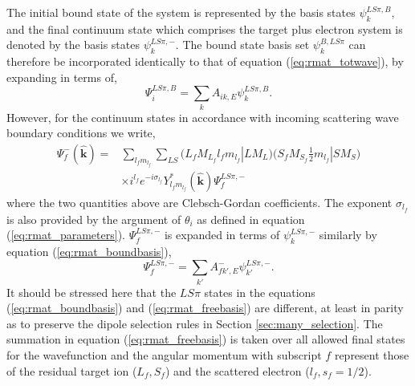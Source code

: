 The initial bound state of the system is represented by the basis states $\psi_k^{LS\pi,B}$, and the final continuum state which comprises the target plus electron system is denoted by the basis states $\psi_k^{LS\pi,-}$. The bound state basis set $\psi_k^{B, LS\pi}$ can therefore be incorporated identically to that of equation (\ref{eq:rmat_totwave}), by expanding in terms of,
\begin{equation}\label{eq:rmat_boundbasis}
\Psi_i^{LS\pi,B} =\sum_kA_{ik,E} \psi_k^{LS\pi,B}.
\end{equation}
However, for the continuum states in accordance with incoming scattering wave boundary conditions we write,
\begin{equation}\label{eq:rmat_freebasis}
\begin{split}
\Psi_f^{-}(\boldsymbol{\hat{k}}) = & \sum_{l_fm_{l_f}}\sum_{LS}(L_fM_{L_f}l_fm_{l_f} |LM_L) \Big(S_fM_{S_f}\frac{1}{2}m_{l_f} | SM_S\Big)\\
& \times i^{l_f}e^{-i\sigma_{l_f}}Y_{l_fm_{l_f}}^*(\boldsymbol{\hat{k}})\Psi_f^{LS\pi,-}
\end{split}
\end{equation}
where the two quantities above are Clebsch-Gordan coefficients. The exponent $\sigma_{l_f}$ is also provided by the argument of $\theta_i$ as defined in equation (\ref{eq:rmat_parameters}). $\Psi_f^{LS\pi,-}$ is expanded in terms of $\psi_k^{LS\pi,-}$ similarly by equation (\ref{eq:rmat_boundbasis}),
\begin{equation}\label{eq:rmat_freebasis2}
\Psi_f^{LS\pi,-} =\sum_{k'}A_{fk',E}^- \psi_{k'}^{LS\pi,-}.
\end{equation}
It should be stressed here that the $LS\pi$ states in the equations (\ref{eq:rmat_boundbasis}) and (\ref{eq:rmat_freebasis}) are different, at least in parity as to preserve the dipole selection rules in Section \ref{sec:many_selection}. The summation in equation (\ref{eq:rmat_freebasis}) is taken over all allowed final states for the wavefunction and the angular momentum with subscript $f$ represent those of the residual target ion ($L_f, S_f$) and the scattered electron ($l_f, s_f = 1/2$).

